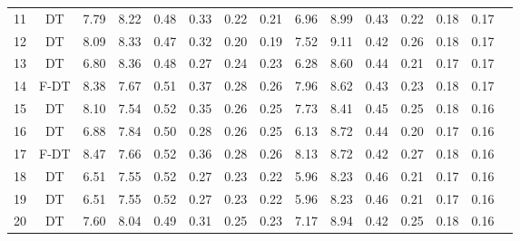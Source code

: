\begin{longtable}{@{\hskip3pt}c@{\hskip3pt}c@{\hskip3pt}c@{\hskip3pt}c@{\hskip3pt}c@{\hskip3pt}c@{\hskip3pt}c@{\hskip3pt}c@{\hskip3pt}c@{\hskip3pt}c@{\hskip3pt}c@{\hskip3pt}c@{\hskip3pt}c@{\hskip3pt}c@{\hskip3pt}c}
         11 &             DT &              7.79 &        8.22 &          0.48 &        0.33 &        0.22 &         0.21 &                6.96 &        8.99 &          0.43 &        0.22 &        0.18 &         0.17 \\
         12 &             DT &              8.09 &        8.33 &          0.47 &        0.32 &        0.20 &         0.19 &                7.52 &        9.11 &          0.42 &        0.26 &        0.18 &         0.17 \\
         13 &             DT &              6.80 &        8.36 &          0.48 &        0.27 &        0.24 &         0.23 &                6.28 &        8.60 &          0.44 &        0.21 &        0.17 &         0.17 \\
         14 &           F-DT &              8.38 &        7.67 &          0.51 &        0.37 &        0.28 &         0.26 &                7.96 &        8.62 &          0.43 &        0.23 &        0.18 &         0.17 \\
         15 &             DT &              8.10 &        7.54 &          0.52 &        0.35 &        0.26 &         0.25 &                7.73 &        8.41 &          0.45 &        0.25 &        0.18 &         0.16 \\
         16 &             DT &              6.88 &        7.84 &          0.50 &        0.28 &        0.26 &         0.25 &                6.13 &        8.72 &          0.44 &        0.20 &        0.17 &         0.16 \\
         17 &           F-DT &              8.47 &        7.66 &          0.52 &        0.36 &        0.28 &         0.26 &                8.13 &        8.72 &          0.42 &        0.27 &        0.18 &         0.16 \\
         18 &             DT &              6.51 &        7.55 &          0.52 &        0.27 &        0.23 &         0.22 &                5.96 &        8.23 &          0.46 &        0.21 &        0.17 &         0.16 \\
         19 &             DT &              6.51 &        7.55 &          0.52 &        0.27 &        0.23 &         0.22 &                5.96 &        8.23 &          0.46 &        0.21 &        0.17 &         0.16 \\
         20 &             DT &              7.60 &        8.04 &          0.49 &        0.31 &        0.25 &         0.23 &                7.17 &        8.94 &          0.42 &        0.25 &        0.18 &         0.16 \\

\end{longtable}
